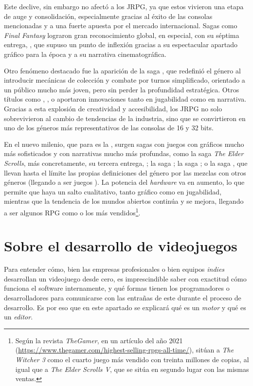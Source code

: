 Este declive, sin embargo no afectó a los JRPG, ya que estos vivieron una etapa de auge y consolidación, especialmente gracias al éxito de las consolas mencionadas y a una fuerte apuesta por el mercado internacional. Sagas como \textit{Final Fantasy} lograron gran reconocimiento global, en especial, con su séptima entrega, \cite{ffvii}, que supuso un punto de inflexión gracias a su espectacular apartado gráfico para la época y a su narrativa cinematográfica. 

\smallskip

Otro fenómeno destacado fue la aparición de la saga \cite{pokemon}, que redefinió el género al introducir mecánicas de colección y combate por turnos simplificado, orientado a un público mucho más joven, pero sin perder la profundidad estratégica. Otros títulos como \cite{chronotrigger}, \cite{secretofmana}, o \cite{suikoden} aportaron innovaciones tanto en jugabilidad como en narrativa. Gracias a esta explosión de creatividad y accesibilidad, los JRPG no solo sobrevivieron al cambio de tendencias de la industria, sino que se convirtieron en uno de los géneros más representativos de las consolas de 16 y 32 bits.

\medskip

En el nuevo milenio, que para \citeauthor{barton2008dungeons} es la , surgen sagas con juegos con gráficos mucho más sofisticados y con narrativas mucho más profundas, como la saga \textit{The Elder Scrolls}, más concretamente, su tercera entrega, ; la saga ; la saga ; o la saga , que llevan hasta el límite las propias definiciones del género por las mezclas con otros géneros (llegando a ser juegos ). La potencia del \textit{hardware} va en aumento, lo que permite que haya un salto cualitativo, tanto gráfico como en jugabilidad, mientras que la tendencia de los mundos abiertos continúa y se mejora, llegando a ser algunos RPG como  o  los más vendidos\footnote{Según la revista \textit{TheGamer}, en un artículo del año 2021 (\url{https://www.thegamer.com/highest-selling-rpgs-all-time/}), sitúan a \textit{The Witcher 3} como el cuarto juego más vendido con treinta millones de copias, al igual que a \textit{The Elder Scrolls V}, que se sitúa en segundo lugar con las mismas ventas.}.

\section{Sobre el desarrollo de videojuegos}
Para entender cómo, bien las empresas profesionales o bien equipos \textit{indies} desarrollan un videojuego desde cero, es imprescindible saber con exactitud cómo funciona el software internamente, y qué formas tienen los programadores o desarrolladores para comunicarse con las entrañas de este durante el proceso de desarrollo. Es por eso que en este apartado se explicará qué es un \textit{motor} y qué es un \textit{editor}.

